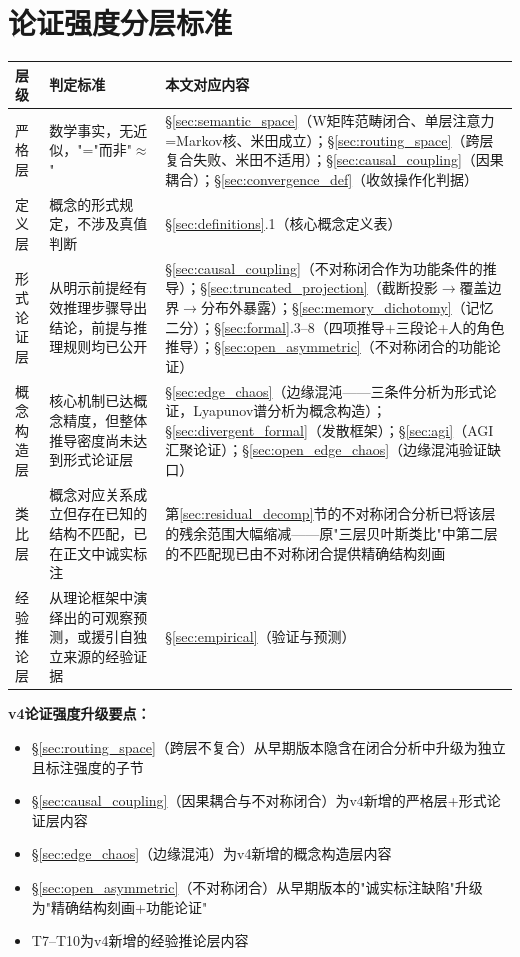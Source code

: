 \documentclass[11pt,a4paper]{article}
\theoremstyle{definition}
\begin{document}
\section{论证强度分层标准}

\begin{table}[H]
\centering
\begin{tabular}{@{}p{2cm}p{5.5cm}p{5cm}@{}}
\toprule
\textbf{层级} & \textbf{判定标准} & \textbf{本文对应内容} \\
\midrule
严格层 & 数学事实，无近似，"="而非"$\approx$" & \S\ref{sec:semantic_space}（W矩阵范畴闭合、单层注意力=Markov核、米田成立）；\S\ref{sec:routing_space}（跨层复合失败、米田不适用）；\S\ref{sec:causal_coupling}（因果耦合）；\S\ref{sec:convergence_def}（收敛操作化判据） \\
定义层 & 概念的形式规定，不涉及真值判断 & \S\ref{sec:definitions}.1（核心概念定义表） \\
形式论证层 & 从明示前提经有效推理步骤导出结论，前提与推理规则均已公开 & \S\ref{sec:causal_coupling}（不对称闭合作为功能条件的推导）；\S\ref{sec:truncated_projection}（截断投影$\to$覆盖边界$\to$分布外暴露）；\S\ref{sec:memory_dichotomy}（记忆二分）；\S\ref{sec:formal}.3--8（四项推导+三段论+人的角色推导）；\S\ref{sec:open_asymmetric}（不对称闭合的功能论证） \\
概念构造层 & 核心机制已达概念精度，但整体推导密度尚未达到形式论证层 & \S\ref{sec:edge_chaos}（边缘混沌——三条件分析为形式论证，Lyapunov谱分析为概念构造）；\S\ref{sec:divergent_formal}（发散框架）；\S\ref{sec:agi}（AGI汇聚论证）；\S\ref{sec:open_edge_chaos}（边缘混沌验证缺口） \\
类比层 & 概念对应关系成立但存在已知的结构不匹配，已在正文中诚实标注 & 第\ref{sec:residual_decomp}节的不对称闭合分析已将该层的残余范围大幅缩减——原"三层贝叶斯类比"中第二层的不匹配现已由不对称闭合提供精确结构刻画 \\
经验推论层 & 从理论框架中演绎出的可观察预测，或援引自独立来源的经验证据 & \S\ref{sec:empirical}（验证与预测） \\
\bottomrule
\end{tabular}
\end{table}

\textbf{v4论证强度升级要点：}
\begin{itemize}[leftmargin=*,itemsep=0.2em]
    \item \S\ref{sec:routing_space}（跨层不复合）从早期版本隐含在闭合分析中升级为独立且标注强度的子节
    \item \S\ref{sec:causal_coupling}（因果耦合与不对称闭合）为v4新增的严格层+形式论证层内容
    \item \S\ref{sec:edge_chaos}（边缘混沌）为v4新增的概念构造层内容
    \item \S\ref{sec:open_asymmetric}（不对称闭合）从早期版本的"诚实标注缺陷"升级为"精确结构刻画+功能论证"
    \item T7--T10为v4新增的经验推论层内容
\end{itemize}
\end{document}
